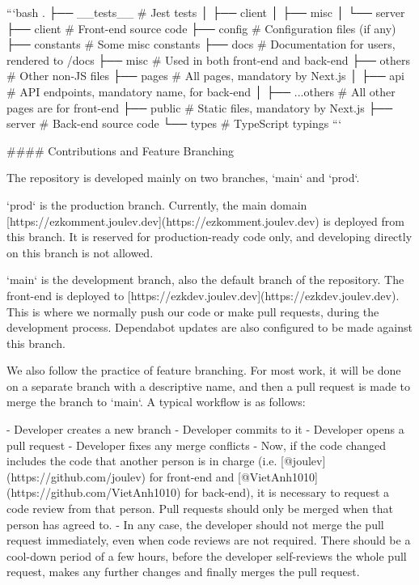 \documentclass[11pt]{article}
\begin{document}
\begin{markdown}
```bash
.
├── __tests__             # Jest tests
│   ├── client
│   ├── misc
│   └── server
├── client                # Front-end source code
├── config                # Configuration files (if any)
├── constants             # Some misc constants
├── docs                  # Documentation for users, rendered to /docs
├── misc                  # Used in both front-end and back-end
├── others                # Other non-JS files
├── pages                 # All pages, mandatory by Next.js
│   ├── api               # API endpoints, mandatory name, for back-end
│   ├── ...others         # All other pages are for front-end
├── public                # Static files, mandatory by Next.js
├── server                # Back-end source code
└── types                 # TypeScript typings
```

#### Contributions and Feature Branching

The repository is developed mainly on two branches, `main` and `prod`.

`prod` is the production branch. Currently, the main domain [https://ezkomment.joulev.dev](https://ezkomment.joulev.dev) is deployed from this branch. It is reserved for production-ready code only, and developing directly on this branch is not allowed.

`main` is the development branch, also the default branch of the repository. The front-end is deployed to [https://ezkdev.joulev.dev](https://ezkdev.joulev.dev). This is where we normally push our code or make pull requests, during the development process. Dependabot updates are also configured to be made against this branch.

We also follow the practice of feature branching. For most work, it will be done on a separate branch with a descriptive name, and then a pull request is made to merge the branch to `main`. A typical workflow is as follows:

- Developer creates a new branch
- Developer commits to it
- Developer opens a pull request
- Developer fixes any merge conflicts
- Now, if the code changed includes the code that another person is in charge (i.e. [@joulev](https://github.com/joulev) for front-end and [@VietAnh1010](https://github.com/VietAnh1010) for back-end), it is necessary to request a code review from that person. Pull requests should only be merged when that person has agreed to.
- In any case, the developer should not merge the pull request immediately, even when code reviews are not required. There should be a cool-down period of a few hours, before the developer self-reviews the whole pull request, makes any further changes and finally merges the pull request.


\end{markdown}
\end{document}
